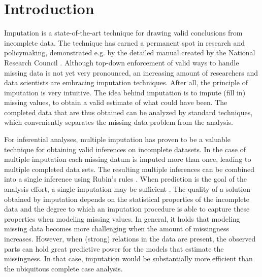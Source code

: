 \documentclass[bimj,fleqn]{w-art}
\begin{document}
\maketitle          %







\section{Introduction}

Imputation is a state-of-the-art technique for drawing valid conclusions from incomplete data. The technique has earned a permanent spot in research and policymaking, demonstrated e.g. by the detailed manual created by the National Research Council \citep*{little2012prevention}. Although top-down enforcement of valid ways to handle missing data is not yet very pronounced, an increasing amount of researchers and data scientists are embracing imputation techniques. After all, the principle of imputation is very intuitive. The idea behind imputation is to impute (fill in) missing values, to obtain a valid estimate of what could have been. The completed data that are thus obtained can be analyzed by standard techniques, which conveniently separates the missing data problem from the analysis. 

For inferential analyses, multiple imputation \citep{rubi76} has proven to be a valuable technique for obtaining valid inferences on incomplete datasets. In the case of multiple imputation each missing datum is imputed more than once, leading to multiple completed data sets. The resulting multiple inferences can be combined into a single inference using Rubin's rules \citep[][p. 76]{rubi87}. When prediction is the goal of the analysis effort, a single imputation may be sufficient \citep{nijm20}. The quality of a solution obtained by imputation depends on the statistical properties of the incomplete data and the degree to which an imputation procedure is able to capture these properties when modeling missing values. In general, it holds that modeling missing data becomes more challenging when the amount of missingness increases. However, when (strong) relations in the data are present, the observed parts can hold great predictive power for the models that estimate the missingness. In that case, imputation would be substantially more efficient than the ubiquitous complete case analysis.
\end{document}
